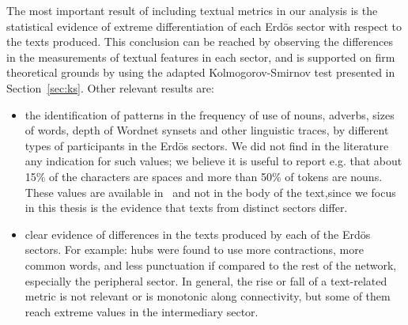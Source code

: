																									  The most important result of including textual metrics in our analysis is the
																									  statistical evidence of extreme differentiation of each Erd\"os sector with respect to the texts produced.
																									  This conclusion can be reached by observing the differences in the measurements of textual features in
																									  each sector, and is supported on firm theoretical grounds by using the adapted Kolmogorov-Smirnov test presented in Section~\ref{sec:ks}.
																									  Other relevant results are:
																									  \begin{itemize}
																									  	\item the identification of patterns in the frequency of use of nouns, adverbs, sizes of words, depth of Wordnet synsets and other linguistic traces, by different types of participants in the Erd\"os sectors. We did not find in the literature any indication for such values; we believe it is useful to report e.g. that about 15\% of the characters are spaces and more than 50\% of tokens are nouns.
																												These values are available in~\cite{textTables} and not in the body of the text,since we focus in this thesis is the evidence that texts from distinct sectors differ.
																													\item clear evidence of differences in the texts produced by each of the Erd\"os sectors. For example: hubs were found to use more contractions,
																															more common words, and less punctuation if compared to the rest of the network,
																																	especially the peripheral sector.
																																			In general, the rise or fall of a text-related metric is not relevant or is monotonic along connectivity,
																																					but some of them reach extreme values in the intermediary sector.
																																							\end{itemize}

